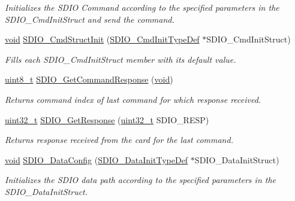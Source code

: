 \begin{DoxyCompactItemize}
\begin{DoxyCompactList}\small\item\em Initializes the S\+D\+IO Command according to the specified parameters in the S\+D\+I\+O\+\_\+\+Cmd\+Init\+Struct and send the command. \end{DoxyCompactList}\item 
\hyperlink{usb__devapi_8h_afabf60e7f57651d6d595a02c75f07cd0}{void} \hyperlink{group___s_d_i_o___exported___functions_ga09d9e89f49c87c82aec79c97b7068e24}{S\+D\+I\+O\+\_\+\+Cmd\+Struct\+Init} (\hyperlink{struct_s_d_i_o___cmd_init_type_def}{S\+D\+I\+O\+\_\+\+Cmd\+Init\+Type\+Def} $\ast$S\+D\+I\+O\+\_\+\+Cmd\+Init\+Struct)
\begin{DoxyCompactList}\small\item\em Fills each S\+D\+I\+O\+\_\+\+Cmd\+Init\+Struct member with its default value. \end{DoxyCompactList}\item 
\hyperlink{_p_e___types_8h_aba7bc1797add20fe3efdf37ced1182c5}{uint8\+\_\+t} \hyperlink{group___s_d_i_o___exported___functions_ga9badf271c818e09da301d715c4ad0e5b}{S\+D\+I\+O\+\_\+\+Get\+Command\+Response} (\hyperlink{usb__devapi_8h_afabf60e7f57651d6d595a02c75f07cd0}{void})
\begin{DoxyCompactList}\small\item\em Returns command index of last command for which response received. \end{DoxyCompactList}\item 
\hyperlink{_p_e___types_8h_a33594304e786b158f3fb30289278f5af}{uint32\+\_\+t} \hyperlink{group___s_d_i_o___exported___functions_ga5c1e859511840e8cca6a9a768bce220b}{S\+D\+I\+O\+\_\+\+Get\+Response} (\hyperlink{_p_e___types_8h_a33594304e786b158f3fb30289278f5af}{uint32\+\_\+t} S\+D\+I\+O\+\_\+\+R\+E\+SP)
\begin{DoxyCompactList}\small\item\em Returns response received from the card for the last command. \end{DoxyCompactList}\item 
\hyperlink{usb__devapi_8h_afabf60e7f57651d6d595a02c75f07cd0}{void} \hyperlink{group___s_d_i_o___exported___functions_gad65d896ae919683585bda44a1e2afae4}{S\+D\+I\+O\+\_\+\+Data\+Config} (\hyperlink{struct_s_d_i_o___data_init_type_def}{S\+D\+I\+O\+\_\+\+Data\+Init\+Type\+Def} $\ast$S\+D\+I\+O\+\_\+\+Data\+Init\+Struct)
\begin{DoxyCompactList}\small\item\em Initializes the S\+D\+IO data path according to the specified parameters in the S\+D\+I\+O\+\_\+\+Data\+Init\+Struct. \end{DoxyCompactList}\item 

\end{DoxyCompactItemize}
